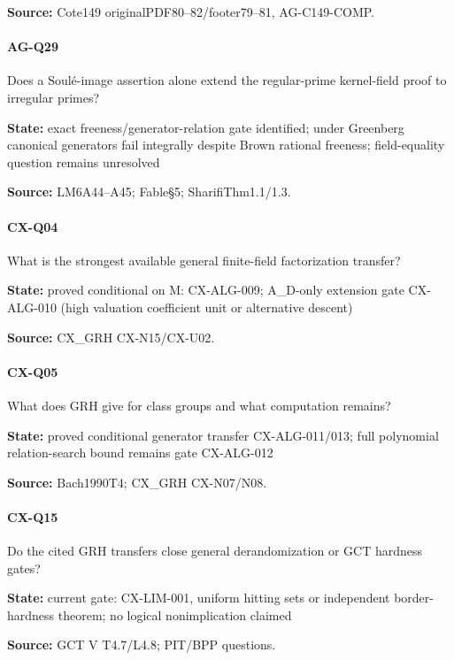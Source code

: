 \documentclass[11pt,a4paper]{article}
\begin{document}
\textbf{Source:} Cote149 originalPDF80–\allowbreak{}82/\allowbreak{}footer79–\allowbreak{}81, AG-C149-COMP.

\paragraph{AG-Q29} Does a Soulé-image assertion alone extend the regular-prime kernel-field proof to irregular primes?

\textbf{State:} exact freeness/\allowbreak{}generator-relation gate identified; under Greenberg canonical generators fail integrally despite Brown rational freeness; field-equality question remains unresolved

\textbf{Source:} LM6A44–\allowbreak{}A45; Fable§5; SharifiThm1.\allowbreak{}1/\allowbreak{}1.\allowbreak{}3.

\paragraph{CX-Q04} What is the strongest available general finite-field factorization transfer?

\textbf{State:} proved conditional on M:\allowbreak{} CX-ALG-009; A\_\allowbreak{}D-only extension gate CX-ALG-010 (high valuation coefficient unit or alternative descent)

\textbf{Source:} CX\_\allowbreak{}GRH CX-N15/\allowbreak{}CX-U02.

\paragraph{CX-Q05} What does GRH give for class groups and what computation remains?

\textbf{State:} proved conditional generator transfer CX-ALG-011/\allowbreak{}013; full polynomial relation-search bound remains gate CX-ALG-012

\textbf{Source:} Bach1990T4; CX\_\allowbreak{}GRH CX-N07/\allowbreak{}N08.

\paragraph{CX-Q15} Do the cited GRH transfers close general derandomization or GCT hardness gates?

\textbf{State:} current gate:\allowbreak{} CX-LIM-001, uniform hitting sets or independent border-hardness theorem; no logical nonimplication claimed

\textbf{Source:} GCT V T4.\allowbreak{}7/\allowbreak{}L4.\allowbreak{}8; PIT/\allowbreak{}BPP questions.
\end{document}
